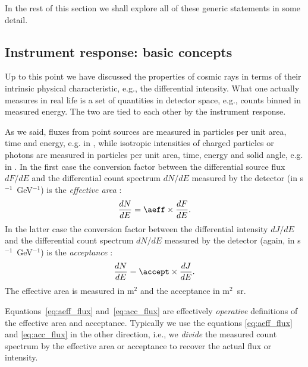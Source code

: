 In the rest of this section we shall explore all of these generic statements in
some detail.


\subsection{Instrument response: basic concepts}
\label{sec:irf}

Up to this point we have discussed the properties of cosmic rays in terms of their
intrinsic physical characteristic, e.g., the differential intensity. What one
actually measures in real life is a set of quantities in detector space, e.g.,
counts binned in measured energy. The two are tied to each other by the instrument
response.

As we said, fluxes from point sources are measured in particles per unit area,
time and energy, e.g. in \fluxunits, while isotropic intensities of charged particles
or photons are measured in particles per unit area, time, energy and solid angle,
e.g. in \intensityunits. In the first case the conversion factor between the
differential source flux $dF/dE$ and the differential count spectrum $dN/dE$ measured
by the detector (in s$^{-1}$~GeV$^{-1}$) is the \emph{effective area} \aeff:
\begin{align}\label{eq:aeff_flux}
  \frac{dN}{dE} = \aeff \times \frac{dF}{dE}.
\end{align}
In the latter case the conversion factor between the differential intensity $dJ/dE$
and the differential count spectrum $dN/dE$ measured by the detector (again, in
s$^{-1}$~GeV$^{-1}$) is the \emph{acceptance} \accept:
\begin{align}\label{eq:acc_flux}
  \frac{dN}{dE} = \accept \times \frac{dJ}{dE}.
\end{align}
The effective area is measured in m$^2$ and the acceptance in m$^2$~sr.

Equations~\eqref{eq:aeff_flux} and~\eqref{eq:acc_flux} are effectively
\emph{operative} definitions of the effective area and acceptance.
Typically we use the equations \eqref{eq:aeff_flux} and \eqref{eq:acc_flux} in the
other direction, i.e., we \emph{divide} the measured count
spectrum by the effective area or acceptance to recover the actual flux or intensity.

